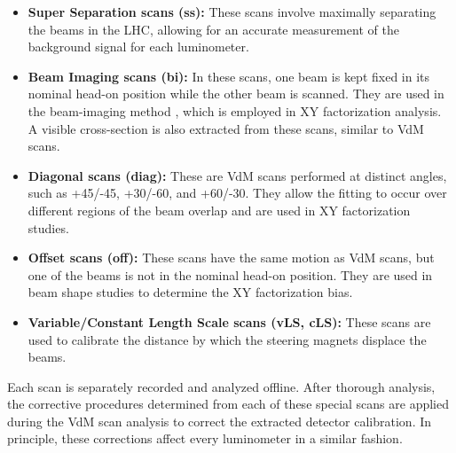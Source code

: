 \begin{itemize}
    \item \textbf{Super Separation scans (ss):} These scans involve maximally separating the beams in the LHC, allowing for an accurate measurement of the background signal for each luminometer.
    \item \textbf{Beam Imaging scans (bi):} In these scans, one beam is kept fixed in its nominal head-on position while the other beam is scanned. They are used in the beam-imaging method \cite{Klute_2017}, which is employed in XY factorization analysis. A visible cross-section is also extracted from these scans, similar to VdM scans.
    \item \textbf{Diagonal scans (diag):} These are VdM scans performed at distinct angles, such as +45/-45, +30/-60, and +60/-30. They allow the fitting to occur over different regions of the beam overlap and are used in XY factorization studies.
    \item \textbf{Offset scans (off):} These scans have the same motion as VdM scans, but one of the beams is not in the nominal head-on position. They are used in beam shape studies to determine the XY factorization bias.
    \item \textbf{Variable/Constant Length Scale scans (vLS, cLS):} These scans are used to calibrate the distance by which the steering magnets displace the beams.
\end{itemize}

Each scan is separately recorded and analyzed offline. After thorough analysis, the corrective procedures determined from each of these special scans are applied during the VdM scan analysis to correct the extracted detector calibration. In principle, these corrections affect every luminometer in a similar fashion.
